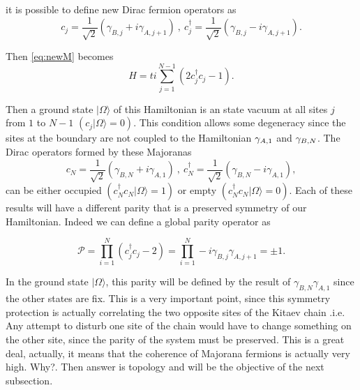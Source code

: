 \noindent it is possible to define new Dirac fermion operators as 
$$c_j = \frac{1}{\sqrt{2}} \left( \gamma_{B,j}+ i\gamma_{A,j+1} \right) \ , \ c^\dagger_j = \frac{1}{\sqrt{2}} \left( \gamma_{B,j}- i\gamma_{A,j+1} \right). $$

Then \eqref{eq:newM} becomes 
\begin{equation}
H = ti\sum_{j=1}^{N-1} \left(  2c^\dagger_jc_j-1 \right). \label{eq:newM} 
\end{equation}

Then a ground state $\vert \Omega \rangle$ of this Hamiltonian is an state vacuum at all sites $j$ from $1$ to $N-1$ $(c_j\vert \Omega \rangle = 0)$. This condition allows some degeneracy since the sites at the boundary are not coupled to the Hamiltonian $\gamma_{A,1}$ and $\gamma_{B,N}$. The Dirac  operators formed by these Majoranas 
$$c_N = \frac{1}{\sqrt{2}} \left( \gamma_{B,N}+ i\gamma_{A,1} \right) \ , \ c^\dagger_N = \frac{1}{\sqrt{2}} \left( \gamma_{B,N}- i\gamma_{A,1} \right), $$ 
can be either occupied $(c^\dagger_N c_N \vert \Omega \rangle = 1)$ or empty $(c^\dagger_N c_N \vert \Omega \rangle = 0)$. Each of these results will have a different parity that is a preserved symmetry of our Hamiltonian.   Indeed we can define a global parity operator as 

\begin{equation}
    \mathcal{P} =\prod_{i = 1}^N\left(  c^\dagger_jc_j-2 \right) = \prod_{i = 1}^N -i\gamma_{B,j}\gamma_{A,j+1}= \pm 1. 
\end{equation}

In the ground state $\vert \Omega \rangle$, this parity will be  defined by the result of  $\gamma_{B,N}\gamma_{A,1}$ since the other states are fix. This is a very important point, since this symmetry protection is actually correlating the two opposite sites of the Kitaev chain .i.e. Any attempt to disturb one site of the chain would have to change something on the other site, since the parity of the system must be preserved. This is a great deal, actually, it means that the coherence of Majorana fermions is actually very high. Why?. Then answer is topology and will be the objective of the next subsection.





